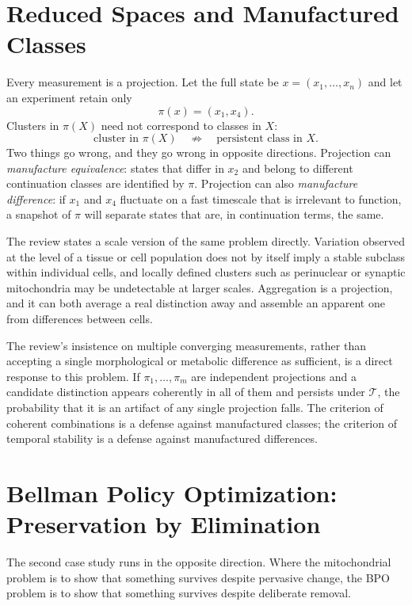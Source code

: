 \documentclass[11pt]{article}
\theoremstyle{remark}
\begin{document}
\section{Reduced Spaces and Manufactured Classes}\label{sec:projection}

Every measurement is a projection. Let the full state be $x=(x_1,\dots,x_n)$ and let an experiment retain only
\[
\pi(x) = (x_1, x_4).
\]
Clusters in $\pi(X)$ need not correspond to classes in $X$:
\[
\text{cluster in }\pi(X)\quad\not\Rightarrow\quad\text{persistent class in }X.
\]
Two things go wrong, and they go wrong in opposite directions. Projection can \emph{manufacture equivalence}: states that differ in $x_2$ and belong to different continuation classes are identified by $\pi$. Projection can also \emph{manufacture difference}: if $x_1$ and $x_4$ fluctuate on a fast timescale that is irrelevant to function, a snapshot of $\pi$ will separate states that are, in continuation terms, the same.

The review states a scale version of the same problem directly. Variation observed at the level of a tissue or cell population does not by itself imply a stable subclass within individual cells, and locally defined clusters such as perinuclear or synaptic mitochondria may be undetectable at larger scales. Aggregation is a projection, and it can both average a real distinction away and assemble an apparent one from differences between cells.

The review's insistence on multiple converging measurements, rather than accepting a single morphological or metabolic difference as sufficient, is a direct response to this problem. If $\pi_1,\dots,\pi_m$ are independent projections and a candidate distinction appears coherently in all of them and persists under $\mathcal T$, the probability that it is an artifact of any single projection falls. The criterion of coherent combinations is a defense against manufactured classes; the criterion of temporal stability is a defense against manufactured differences.

\section{Bellman Policy Optimization: Preservation by Elimination}

The second case study runs in the opposite direction. Where the mitochondrial problem is to show that something survives despite pervasive change, the BPO problem is to show that something survives despite deliberate removal.
\end{document}
